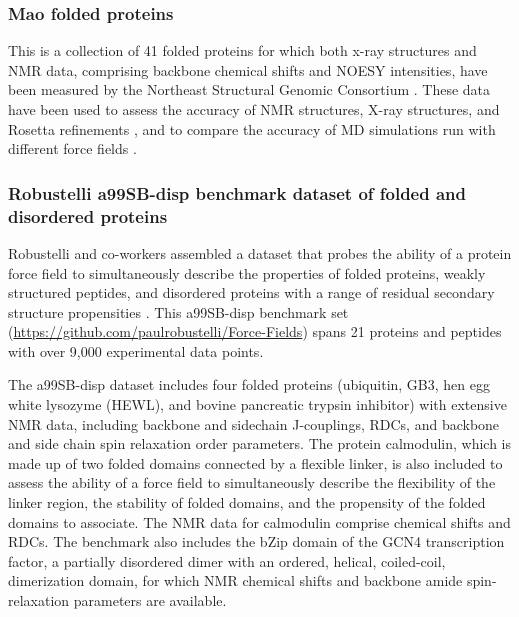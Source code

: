 \documentclass[9pt,review]{livecoms}
\begin{document}
\subsubsection{Mao folded proteins}
\label{sub2:mao}

This is a collection of 41 folded proteins for which both x-ray structures and NMR data, comprising backbone chemical shifts and NOESY intensities, have been measured by the Northeast Structural Genomic Consortium \cite{mao_protein_2014}.
These data have been used to assess the accuracy of NMR structures, X-ray structures, and Rosetta refinements \cite{mao_protein_2014}, and to compare the accuracy of MD simulations run with different force fields \cite{robustelli_developing_2018,piana_development_2020}.

\subsubsection{Robustelli a99SB-disp benchmark dataset of folded and disordered proteins}
\label{sub2:robustelli}

Robustelli and co-workers assembled a dataset that probes the ability of a protein force field to simultaneously describe the properties of folded proteins, weakly structured peptides, and disordered proteins with a range of residual secondary structure propensities \cite{piana_water_2015,robustelli_developing_2018,piana_development_2020}.
This a99SB-disp benchmark set (\url{https://github.com/paulrobustelli/Force-Fields}) spans 21 proteins and peptides with over 9,000 experimental data points.

The a99SB-disp dataset includes four folded proteins (ubiquitin, GB3, hen egg white lysozyme (HEWL), and bovine pancreatic trypsin inhibitor) with extensive NMR data, including backbone and sidechain J-couplings, RDCs, and backbone and side chain spin relaxation order parameters.
The protein calmodulin, which is made up of two folded domains connected by a flexible linker, is also included to assess the ability of a force field to simultaneously describe the flexibility of the linker region, the stability of folded domains, and the propensity of the folded domains to associate.
The NMR data for calmodulin comprise chemical shifts and RDCs.
The benchmark also includes the bZip domain of the GCN4 transcription factor, a partially disordered dimer with an ordered, helical, coiled-coil, dimerization domain, for which NMR chemical shifts and backbone amide spin-relaxation parameters are available. 
\end{document}
